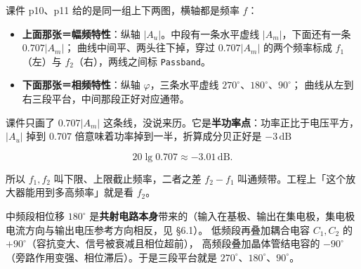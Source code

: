\documentclass[11pt]{ctexart}
\begin{document}

课件 p10、p11 给的是同一组上下两图，横轴都是频率 $f$：

\begin{itemize}
\item \textbf{上面那张＝幅频特性}：纵轴 $|A_u|$。中段有一条水平虚线 $|A_m|$，下面还有一条 $0.707|A_m|$；
曲线中间平、两头往下掉，穿过 $0.707|A_m|$ 的两个频率标成 $f_1$（左）与 $f_2$（右），两线之间标 \texttt{Passband}。
\item \textbf{下面那张＝相频特性}：纵轴 $\varphi$，三条水平虚线 $270^\circ$、$180^\circ$、$90^\circ$；
曲线从左到右三段平台，中间那段正好对应通带。
\end{itemize}


课件只画了 $0.707|A_m|$ 这条线，没说来历。它是\textbf{半功率点}：功率正比于电压平方，
$|A_u|$ 掉到 $0.707$ 倍意味着功率掉到一半，折算成分贝正好是 $-3\,\mathrm{dB}$

\[ 20\lg 0.707\approx -3.01\,\mathrm{dB} . \]

所以 $f_1,f_2$ 叫下限、上限截止频率，二者之差 $f_2-f_1$ 叫通频带。工程上「这个放大器能用到多高频率」就是看 $f_2$。


中频段相位移 $180^\circ$ 是\textbf{共射电路本身}带来的（输入在基极、输出在集电极，集电极电流方向与输出电压参考方向相反，见 §6.1）。
低频段再叠加耦合电容 $C_1,C_2$ 的 $+90^\circ$（容抗变大、信号被衰减且相位超前），
高频段叠加晶体管结电容的 $-90^\circ$（旁路作用变强、相位滞后）。于是三段平台就是 $270^\circ$、$180^\circ$、$90^\circ$。



\end{document}
